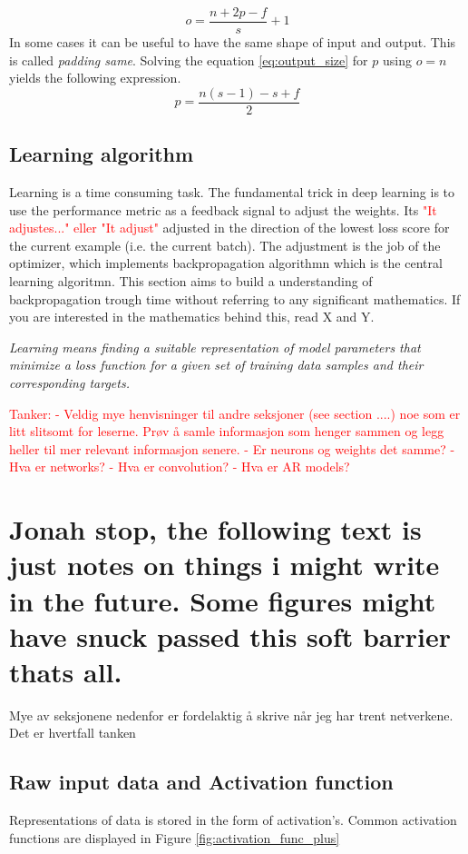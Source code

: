 \documentclass{article}
\begin{document}
\begin{equation} \label{eq:output_size}
    o = \frac{n+2p-f}{s} + 1
\end{equation}
In some cases it can be useful to have the same shape of input and output. This is called \textit{padding same}. Solving the equation \eqref{eq:output_size} for $p$ using $o=n$ yields the following expression.
\begin{equation} \label{eq:padding_same}
    p = \frac{n\left(s-1\right)-s+f}{2}
\end{equation}

\subsection{Learning algorithm} \label{sec:backprop_learning_algorithm}
Learning is a time consuming task. The fundamental trick in deep learning is to use the performance metric as a feedback signal to adjust the weights. Its \textcolor{red}{"It adjustes..." eller "It adjust"} adjusted in the direction of the lowest loss score for the current example (i.e. the current batch). The adjustment is the job of the optimizer, which implements backpropagation algorithmn which is the central learning algoritmn. This section aims to build a understanding of backpropagation trough time without referring to any significant mathematics. If you are interested in the mathematics behind this, read X and Y. 


\textit{Learning means finding a suitable representation of model parameters that minimize a loss function for a given set of training data samples and their corresponding targets.}


\textcolor{red}{Tanker: 
- Veldig mye henvisninger til andre seksjoner (see section ....) noe som er litt slitsomt for leserne. Prøv å samle informasjon som henger sammen og legg heller til mer relevant informasjon senere. 
- Er neurons og weights det samme?
- Hva er networks? 
- Hva er convolution? 
- Hva er AR models? 
}
\section{Jonah stop, the following text is just notes on things i might write in the future. Some figures might have snuck passed this soft barrier thats all.}

Mye av seksjonene nedenfor er fordelaktig å skrive når jeg har trent netverkene. Det er hvertfall tanken 

\subsection{Raw input data and Activation function}
Representations of data is stored in the form of activation's. Common activation functions are displayed in Figure \ref{fig:activation_func_plus}
\end{document}
